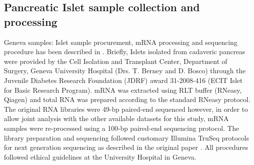 \subsection{Pancreatic Islet sample collection and processing}
Geneva samples: Islet sample procurement, mRNA processing and sequencing procedure has been described in \cite{nicaCelltypeAllelicGenetic2013}. Briefly, Islets isolated from cadaveric pancreas were provided by the Cell Isolation and Transplant Center, Department of Surgery, Geneva University Hospital (Drs. T. Berney and D. Bosco) through the Juvenile Diabetes Research Foundation (JDRF) award 31-2008-416 (ECIT Islet for Basic Research Program). mRNA was extracted using RLT buffer (RNeasy, Qiagen) and total RNA was prepared according to the standard RNeasy protocol. The original RNA libraries were 49-bp paired-end sequenced however, in order to allow joint analysis with the other available datasets for this study, mRNA samples were re-processed using a 100-bp paired-end sequencing protocol. The library preparation and sequencing followed customary Illumina TruSeq protocols for next generation sequencing as described in the original paper \cite{nicaCelltypeAllelicGenetic2013}. All procedures followed ethical guidelines at the University Hospital in Geneva. \\

